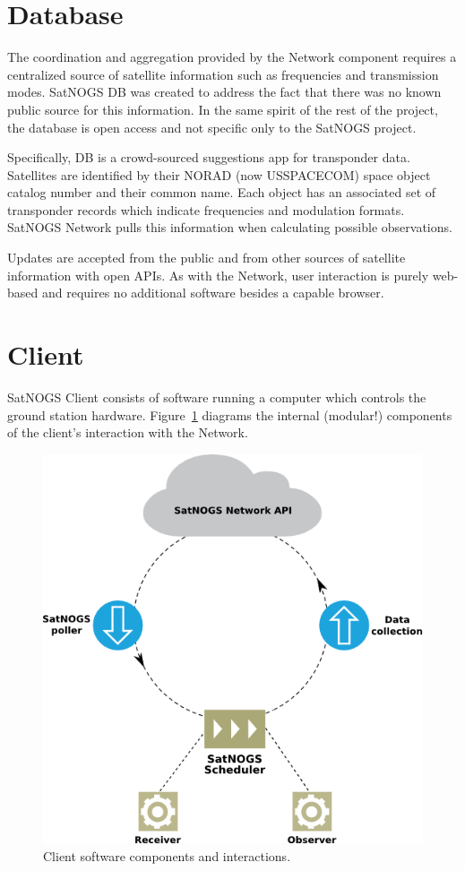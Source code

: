 \documentclass[conference,letterpaper,12pt]{IEEEtran}
\newcommand{\figref}[1]{Figure~\ref{#1}}
\newlength{\imgwidth}
\begin{document}
\section{Database}
The coordination and aggregation provided by the Network component requires a centralized source of satellite information such as frequencies and transmission modes.
SatNOGS DB was created to address the fact that there was no known public source for this information.
In the same spirit of the rest of the project, the database is open access and not specific only to the SatNOGS project.

Specifically, DB is a crowd-sourced suggestions app for transponder data.
Satellites are identified by their NORAD (now USSPACECOM) space object catalog number and their common name.
Each object has an associated set of transponder records which indicate frequencies and modulation formats.
SatNOGS Network pulls this information when calculating possible observations.

Updates are accepted from the public and from other sources of satellite information with open APIs.
As with the Network, user interaction is purely web-based and requires no additional software besides a capable browser.


\section{Client}
SatNOGS Client consists of software running a computer which controls the ground station hardware.
\figref{f:client-flow} diagrams the internal (modular!) components of the client's interaction with the Network.

\begin{figure}[htbp]
\centering
\includegraphics[width=\imgwidth]{fig/client-flow}
\caption{Client software components and interactions.}
\label{f:client-flow}
\end{figure}
\end{document}
